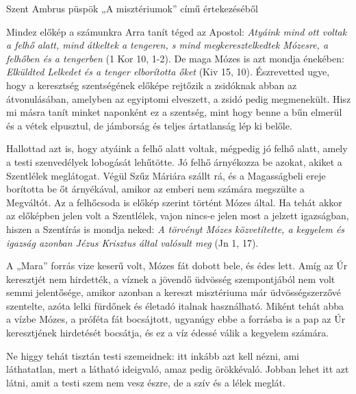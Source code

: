 \documentclass[twoside]{article}
\begin{document}
Szent Ambrus püspök „A misztériumok” című értekezéséből

{\centering{}}

\begin{lectio}{Mindez előkép a számunkra}
\noindent Arra tanít téged az Apostol: \textit{Atyáink mind ott voltak a felhő alatt, mind átkeltek a tengeren, s mind megkeresztelkedtek Mózesre, a felhőben és a tengerben} (1 Kor 10, 1-2). De maga Mózes is azt mondja énekében: \textit{Elküldted Lelkedet és a tenger elborította őket} (Kiv 15, 10). Észrevetted ugye, hogy a keresztség szentségének előképe rejtőzik a zsidóknak abban az átvonulásában, amelyben az egyiptomi elveszett, a zsidó pedig megmenekült. Hisz mi másra tanít minket naponként ez a szentség, mint hogy benne a bűn elmerül és a vétek elpusztul, de jámborság és teljes ártatlanság lép ki belőle.

Hallottad azt is, hogy atyáink a felhő alatt voltak, mégpedig jó felhő alatt, amely a testi szenvedélyek lobogását lehűtötte. Jó felhő árnyékozza be azokat, akiket a Szentlélek meglátogat. Végül Szűz Máriára szállt rá, és a Magasságbeli ereje borította be őt árnyékával, amikor az emberi nem számára megszülte a Megváltót. Az a felhőcsoda is előkép szerint történt Mózes által. Ha tehát akkor az előképben jelen volt a Szentlélek, vajon nincs-e jelen most a jelzett igazságban, hiszen a Szentírás is mondja neked: \textit{A törvényt Mózes közvetítette, a kegyelem és igazság azonban Jézus Krisztus által valósult meg} (Jn 1, 17).

A „Mara” forrás vize keserű volt, Mózes fát dobott bele, és édes lett. Amíg az Úr keresztjét nem hirdették, a víznek a jövendő üdvösség szempontjából nem volt semmi jelentősége, amikor azonban a kereszt misztériuma már üdvösségszerzővé szentelte, azóta lelki fürdőnek és életadó italnak használható. Miként tehát abba a vízbe Mózes, a próféta fát bocsájtott, ugyanúgy ebbe a forrásba is a pap az Úr keresztjének hirdetését bocsátja, és ez a víz édessé válik a kegyelem számára.

Ne higgy tehát tisztán testi szemeidnek: itt inkább azt kell nézni, ami láthatatlan, mert a látható ideigvaló, amaz pedig örökkévaló. Jobban lehet itt azt látni, amit a testi szem nem vesz észre, de a szív és a lélek meglát.


\end{lectio}
\end{document}
